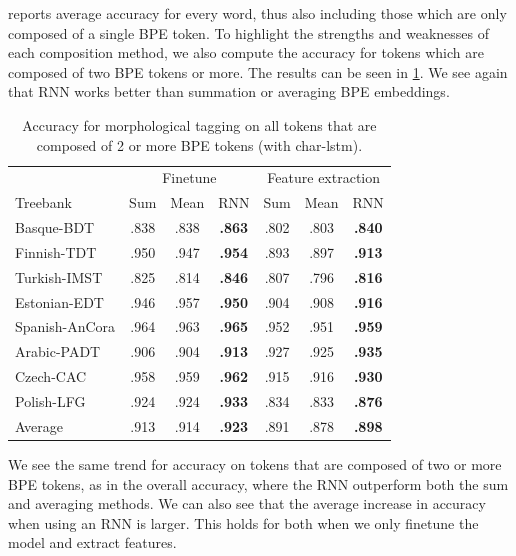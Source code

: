 \documentclass[11pt]{article}
\begin{document}
     reports average accuracy for every word,
    thus also including those which are only composed of a single BPE
    token. To highlight the strengths and weaknesses of each
    composition method, we also compute the accuracy for tokens which
    are composed of two BPE tokens or more. The results can be seen in
    \cref{tab:results_large_tokens}.  We see again that RNN works
    better than summation or averaging BPE embeddings.

    
	\begin{table}%
	\centering
	\begin{tabular}{l|ccc|ccc}
		 & \multicolumn{3}{c}{Finetune} & \multicolumn{3}{c}{Feature extraction} \\
		Treebank & Sum & Mean & RNN & Sum & Mean & RNN  \\
		 \hline
        Basque-BDT      & .838 & .838 & \textbf{.863} & .802 & .803 & \textbf{.840} \\
		Finnish-TDT     & .950 & .947 & \textbf{.954} & .893 & .897 & \textbf{.913} \\ 
		Turkish-IMST    & .825 & .814 & \textbf{.846} & .807 & .796 & \textbf{.816} \\
		Estonian-EDT    & .946 & .957 & \textbf{.950} & .904 & .908 & \textbf{.916} \\
		Spanish-AnCora  & .964 & .963 & \textbf{.965} & .952 & .951 & \textbf{.959} \\
		Arabic-PADT     & .906 & .904 & \textbf{.913} & .927 & .925 & \textbf{.935}\\
		Czech-CAC       & .958 & .959 & \textbf{.962} & .915 & .916 & \textbf{.930} \\
		Polish-LFG      & .924 & .924 & \textbf{.933} & .834 & .833 & \textbf{.876} \\
        \hline
        Average         & .913 & .914 & \textbf{.923} & .891 & .878 & \textbf{.898} \\
	\end{tabular}
	\caption{\label{tab:results_large_tokens} Accuracy for morphological tagging on all tokens that are composed of 2 or more BPE tokens (with char-lstm).}
\end{table}

            We see the same trend for accuracy on tokens that are
     composed of two or more BPE tokens, as in the overall accuracy,
     where the RNN outperform both the sum and averaging methods. We
     can also see that the average increase in accuracy when using an
     RNN is larger. This holds for both when we only finetune the
     model and extract features.
\end{document}
